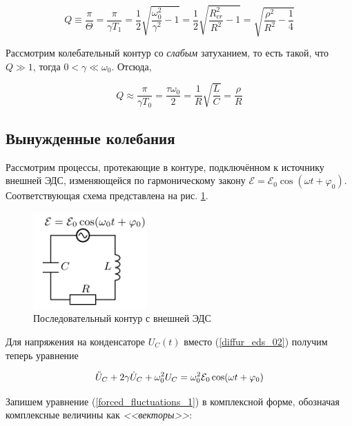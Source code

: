 \documentclass[a4paper, 12pt]{article}
\begin{document}
    \begin{equation}
        Q \equiv \frac{\pi}{\Theta} = \frac{\pi}{\gamma T_1} = \frac{1}{2} \sqrt{\frac{\omega_0^2}{\gamma^2} - 1} = \frac{1}{2} \sqrt{\frac{R_{cr}^2}{R^2} - 1} = \sqrt{\frac{\rho^2}{R^2} - \frac{1}{4}}
    \end{equation}

    Рассмотрим колебательный контур со \textit{слабым} затуханием, то есть такой, что $Q \gg 1$, тогда $0 < \gamma \ll \omega_0$. Отсюда,

    \begin{equation}
        Q \approx \frac{\pi}{\gamma T_0} = \frac{\tau \omega_0}{2} = \frac{1}{R}\sqrt{\frac{L}{C}} = \frac{\rho}{R}
        \label{approxQ}
    \end{equation}

    \subsection{Вынужденные колебания}
    
    Рассмотрим процессы, протекающие в контуре, подключённом к источнику внешней ЭДС, изменяющейся по гармоническому закону $\mathcal{E} = \mathcal{E}_0 \cos(\omega t + \varphi_0)$. Соответствующая схема представлена на рис. \ref{circuit2}.

    \begin{figure}[H]
        \centering
        \includegraphics{images/circuit2.png}
        \caption{Последовательный контур с внешней ЭДС}
        \label{circuit2}
    \end{figure}

    Для напряжения на конденсаторе $U_C(t)$ вместо (\ref{diffur_eds_02}) получим теперь уравнение

    \begin{equation}
        \Ddot{U}_C + 2 \gamma \Dot{U}_C + \omega_0^2 U_C = \omega_0^2 \mathcal{E}_0 \cos(\omega t + \varphi_0)
        \label{forced_fluctuations_1}
    \end{equation}

    Запишем уравнение (\ref{forced_fluctuations_1}) в комплексной форме, обозначая комплексные величины как \textit{<<векторы>>}:
\end{document}
